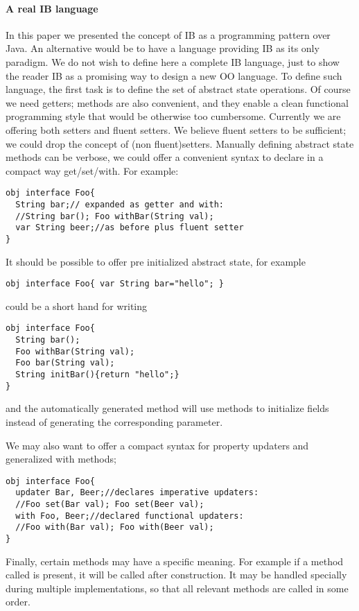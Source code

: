 \paragraph{A real IB language}
In this paper we presented the concept of IB as a programming pattern over Java.
An alternative would be to have a language providing IB as its only paradigm.
We do not wish to define here a complete IB language, just to show the reader IB as
a promising way to design a new OO language.
To define such language, the first task is to define the set of abstract state operations.
Of course we need getters; \Q@withX@ methods are also convenient, and they enable a
clean functional programming style that would be otherwise too cumbersome.
Currently we are offering both setters and fluent setters.
We believe fluent setters to be sufficient; we could drop the concept of (non fluent)setters.
Manually defining abstract state methods can be verbose, we could offer a convenient syntax to
declare in a compact way get/set/with.
For example:
\begin{lstlisting}
obj interface Foo{
  String bar;// expanded as getter and with:
  //String bar(); Foo withBar(String val);
  var String beer;//as before plus fluent setter
}
\end{lstlisting}

\noindent It should be possible to offer pre initialized abstract state, for example
\begin{lstlisting}
obj interface Foo{ var String bar="hello"; }
\end{lstlisting}
\noindent could be a short hand for writing

\begin{lstlisting}
obj interface Foo{
  String bar();
  Foo withBar(String val);
  Foo bar(String val);
  String initBar(){return "hello";}
}
\end{lstlisting}
and the automatically generated \Q@of@ method will use \Q@initX@ methods to initialize fields
instead of generating the corresponding parameter.


We may also want to offer a compact syntax for property updaters and generalized with methods;
\begin{lstlisting}[morekeywords={with}]
obj interface Foo{
  updater Bar, Beer;//declares imperative updaters:
  //Foo set(Bar val); Foo set(Beer val);
  with Foo, Beer;//declared functional updaters:
  //Foo with(Bar val); Foo with(Beer val);
}
\end{lstlisting}
Finally, certain methods may have a specific meaning. For example
if a method called \Q@postInit@ is present, it will be called after construction.
It may be handled specially during multiple implementations, so that all relevant \Q@postInit@ methods are
called in some order.
